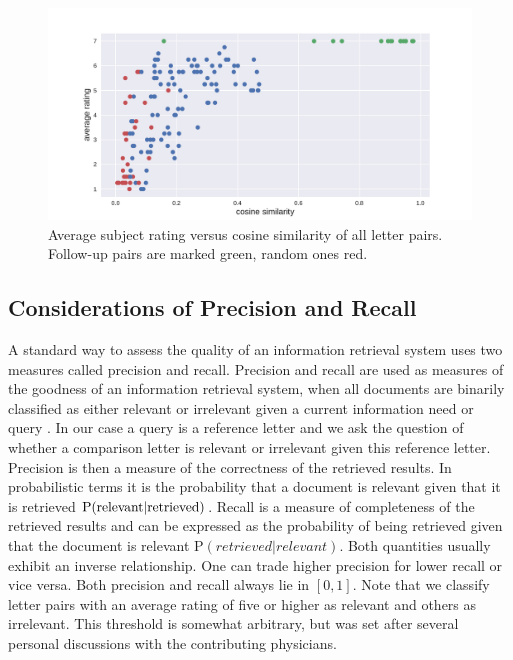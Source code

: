 \begin{figure}
	\includegraphics[width=\linewidth]{figures/rating_vs_similarity}
	\caption{Average subject rating versus cosine similarity of all letter pairs. Follow-up pairs are marked green, random ones red.}
	\label{fig:all_points}
\end{figure}


\subsection*{Considerations of Precision and Recall}
A standard way to assess the quality of an information retrieval system uses two measures called precision and recall. Precision and recall are used as measures of the goodness of an information retrieval system, when all documents are binarily classified as either relevant or irrelevant given a current information need or query \citep{Manning2008prerec}. In our case a query is a reference letter and we ask the question of whether a comparison letter is relevant or irrelevant given this reference letter. Precision is then a measure of the correctness of the retrieved results. In probabilistic terms it is the probability that a document is relevant given that it is retrieved $\rm{P}(relevant|retrieved)$. Recall is a measure of completeness of the retrieved results and can be expressed as the probability of being retrieved given that the document is relevant P$(retrieved|relevant)$. Both quantities usually exhibit an inverse relationship. One can trade higher precision for lower recall or vice versa. Both precision and recall always lie in $[0,1]$. Note that we classify letter pairs with an average rating of five or higher as relevant and others as irrelevant. This threshold is somewhat arbitrary, but was set after several personal discussions with the contributing physicians.


